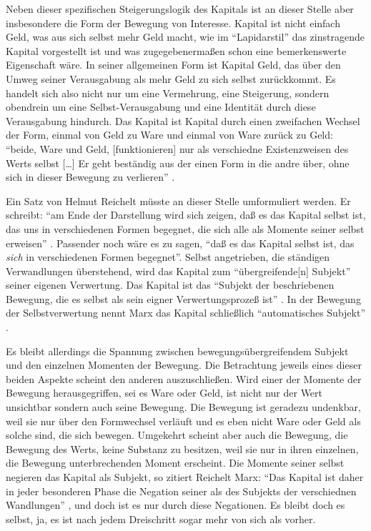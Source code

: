 \documentclass[12pt,
               paper=a4,
               twoside=false,
               onehalfspacing,
               bibliography=totoc,
               toc=graduated,
               ]{scrartcl}
\newcommand{\lips}{\dots\unkern}
\newcommand{\pc}[2]{\parencite[#1]{#2}}
\newcommand{\zn}[3]{\parencite[#1, zit. nach][#2]{#3}}
\begin{document}

Neben dieser spezifischen Steigerungslogik des Kapitals ist an dieser
Stelle aber insbesondere die Form der Bewegung von Interesse. Kapital
ist nicht einfach Geld, was aus sich selbst mehr Geld macht, wie im
"`Lapidarstil"' \pc{170}{kap} das zinstragende Kapital vorgestellt ist
und was zugegebenermaßen schon eine bemerkenswerte Eigenschaft wäre.
In seiner allgemeinen Form ist Kapital Geld, das über den Umweg seiner
Verausgabung als mehr Geld zu sich selbst zurückkommt. Es handelt sich
also nicht nur um eine Vermehrung, eine Steigerung, sondern obendrein
um eine Selbst-Verausgabung und eine Identität durch diese
Verausgabung hindurch. Das Kapital ist Kapital durch einen zweifachen
Wechsel der Form, einmal von Geld zu Ware und einmal von Ware zurück
zu Geld: "`beide, Ware und Geld, [funktionieren] nur als verschiedne
Existenzweisen des Werts selbst [\lips] Er geht beständig aus der
einen Form in die andre über, ohne sich in dieser Bewegung zu
verlieren"' \pc{S. 168 f.}{kap}.


Ein Satz von Helmut Reichelt müsste an dieser Stelle umformuliert
werden. Er schreibt: "`am Ende der Darstellung wird sich zeigen, daß es
das Kapital selbst ist, das uns in verschiedenen Formen begegnet, die
sich alle als Momente seiner selbst erweisen"' \pc{181}{reichelt}.
Passender noch wäre es zu sagen, "`daß es das Kapital selbst ist, das
\emph{sich} in verschiedenen Formen begegnet"'. Selbst angetrieben,
die ständigen Verwandlungen überstehend, wird das Kapital zum
"`übergreifende[n] Subjekt"' \pc{169}{kap} seiner eigenen Verwertung.
Das Kapital ist das "`Subjekt der beschriebenen Bewegung, die es
selbst als sein eigner Verwertungsprozeß ist"'
\zn{Marx}{181}{reichelt}. In der Bewegung der Selbstverwertung nennt
Marx das Kapital schließlich "`automatisches Subjekt"' \pc{169}{kap}.

Es bleibt allerdings die Spannung zwischen bewegungsübergreifendem
Subjekt und den einzelnen Momenten der Bewegung. Die Betrachtung
jeweils eines dieser beiden Aspekte scheint den anderen
auszuschließen. Wird einer der Momente der Bewegung herausgegriffen,
sei es Ware oder Geld, ist nicht nur der Wert unsichtbar sondern auch
seine Bewegung. Die Bewegung ist geradezu undenkbar, weil sie nur über
den Formwechsel verläuft und es eben nicht Ware oder Geld als solche
sind, die sich bewegen. Umgekehrt scheint aber auch die Bewegung, die
Bewegung des Werts, keine Substanz zu besitzen, weil sie nur in ihren
einzelnen, die Bewegung unterbrechenden Moment erscheint. Die Momente
seiner selbst negieren das Kapital als Subjekt, so zitiert Reichelt
Marx: "`Das Kapital ist daher in jeder besonderen Phase die Negation
seiner als des Subjekts der verschiednen Wandlungen"'
\zn{Marx}{181}{reichelt}, und doch ist es nur durch diese Negationen.
Es bleibt doch es selbst, ja, es ist nach jedem Dreischritt sogar mehr
von sich als vorher.
\end{document}
